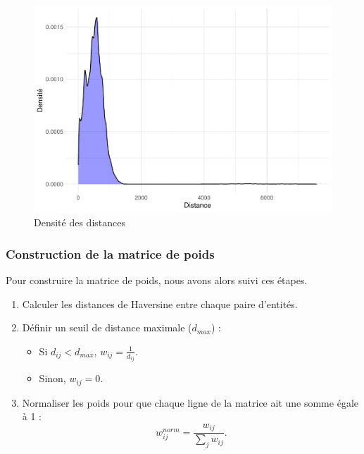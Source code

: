 \documentclass[
]{article}
\providecommand{\tightlist}{%
  \setlength{\itemsep}{0pt}\setlength{\parskip}{0pt}}
\begin{document}
\begin{figure}

{\centering \includegraphics{4_Analyse_Descriptive_files/figure-latex/unnamed-chunk-14-1} 

}

\caption{Densité des distances}\label{fig:unnamed-chunk-14}
\end{figure}

\subsubsection{Construction de la matrice de
poids}\label{construction-de-la-matrice-de-poids}

\hfill\break
Pour construire la matrice de poids, nous avons alors suivi ces
étapes.\\

\begin{enumerate}
\def\labelenumi{\arabic{enumi}.}
\tightlist
\item
  Calculer les distances de Haversine entre chaque paire d'entités.
\item
  Définir un seuil de distance maximale (\(d_{max}\)) :

  \begin{itemize}
  \tightlist
  \item
    Si \(d_{ij} < d_{max}\), \(w_{ij} = \frac{1}{d_{ij}}\).
  \item
    Sinon, \(w_{ij} = 0\).
  \end{itemize}
\item
  Normaliser les poids pour que chaque ligne de la matrice ait une somme
  égale à 1 : \[
   w_{ij}^{norm} = \frac{w_{ij}}{\sum_{j} w_{ij}}.
  \]
\end{enumerate}
\end{document}
